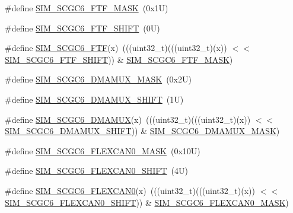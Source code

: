 \begin{DoxyCompactItemize}
\item 
\#define \mbox{\hyperlink{group___s_i_m___register___masks_ga949452096cb8609fdb3503dda3f9f729}{S\+I\+M\+\_\+\+S\+C\+G\+C6\+\_\+\+F\+T\+F\+\_\+\+M\+A\+SK}}~(0x1\+U)
\item 
\#define \mbox{\hyperlink{group___s_i_m___register___masks_gaf767cc087ed5983b84e79996586efb12}{S\+I\+M\+\_\+\+S\+C\+G\+C6\+\_\+\+F\+T\+F\+\_\+\+S\+H\+I\+FT}}~(0\+U)
\item 
\#define \mbox{\hyperlink{group___s_i_m___register___masks_ga2c761f5f9e8cfb50bd7cb870945f4fd3}{S\+I\+M\+\_\+\+S\+C\+G\+C6\+\_\+\+F\+TF}}(x)~(((uint32\+\_\+t)(((uint32\+\_\+t)(x)) $<$$<$ \mbox{\hyperlink{group___s_i_m___register___masks_gaf767cc087ed5983b84e79996586efb12}{S\+I\+M\+\_\+\+S\+C\+G\+C6\+\_\+\+F\+T\+F\+\_\+\+S\+H\+I\+FT}})) \& \mbox{\hyperlink{group___s_i_m___register___masks_ga949452096cb8609fdb3503dda3f9f729}{S\+I\+M\+\_\+\+S\+C\+G\+C6\+\_\+\+F\+T\+F\+\_\+\+M\+A\+SK}})
\item 
\#define \mbox{\hyperlink{group___s_i_m___register___masks_ga10469a89e2c48cd79e29fb73b0d06395}{S\+I\+M\+\_\+\+S\+C\+G\+C6\+\_\+\+D\+M\+A\+M\+U\+X\+\_\+\+M\+A\+SK}}~(0x2\+U)
\item 
\#define \mbox{\hyperlink{group___s_i_m___register___masks_gaa69ac431213fb94ecd1d9ed2fa966e50}{S\+I\+M\+\_\+\+S\+C\+G\+C6\+\_\+\+D\+M\+A\+M\+U\+X\+\_\+\+S\+H\+I\+FT}}~(1\+U)
\item 
\#define \mbox{\hyperlink{group___s_i_m___register___masks_ga9c9ba170477dab6105665d342c48de2f}{S\+I\+M\+\_\+\+S\+C\+G\+C6\+\_\+\+D\+M\+A\+M\+UX}}(x)~(((uint32\+\_\+t)(((uint32\+\_\+t)(x)) $<$$<$ \mbox{\hyperlink{group___s_i_m___register___masks_gaa69ac431213fb94ecd1d9ed2fa966e50}{S\+I\+M\+\_\+\+S\+C\+G\+C6\+\_\+\+D\+M\+A\+M\+U\+X\+\_\+\+S\+H\+I\+FT}})) \& \mbox{\hyperlink{group___s_i_m___register___masks_ga10469a89e2c48cd79e29fb73b0d06395}{S\+I\+M\+\_\+\+S\+C\+G\+C6\+\_\+\+D\+M\+A\+M\+U\+X\+\_\+\+M\+A\+SK}})
\item 
\#define \mbox{\hyperlink{group___s_i_m___register___masks_ga62d67e6ac8f6b99c2d456be532b31a52}{S\+I\+M\+\_\+\+S\+C\+G\+C6\+\_\+\+F\+L\+E\+X\+C\+A\+N0\+\_\+\+M\+A\+SK}}~(0x10\+U)
\item 
\#define \mbox{\hyperlink{group___s_i_m___register___masks_gade95a67c98499139b322e706b4ce3db1}{S\+I\+M\+\_\+\+S\+C\+G\+C6\+\_\+\+F\+L\+E\+X\+C\+A\+N0\+\_\+\+S\+H\+I\+FT}}~(4\+U)
\item 
\#define \mbox{\hyperlink{group___s_i_m___register___masks_ga6bc9b666a8aaf6921f978dcfaa644330}{S\+I\+M\+\_\+\+S\+C\+G\+C6\+\_\+\+F\+L\+E\+X\+C\+A\+N0}}(x)~(((uint32\+\_\+t)(((uint32\+\_\+t)(x)) $<$$<$ \mbox{\hyperlink{group___s_i_m___register___masks_gade95a67c98499139b322e706b4ce3db1}{S\+I\+M\+\_\+\+S\+C\+G\+C6\+\_\+\+F\+L\+E\+X\+C\+A\+N0\+\_\+\+S\+H\+I\+FT}})) \& \mbox{\hyperlink{group___s_i_m___register___masks_ga62d67e6ac8f6b99c2d456be532b31a52}{S\+I\+M\+\_\+\+S\+C\+G\+C6\+\_\+\+F\+L\+E\+X\+C\+A\+N0\+\_\+\+M\+A\+SK}})
$$
\end{DoxyCompactItemize}
